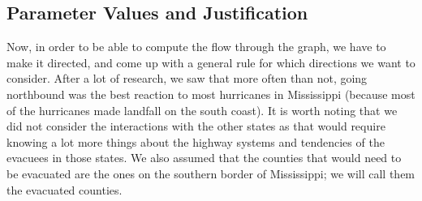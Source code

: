 \documentclass[titlepage]{article}
\begin{document}
  \subsection{Parameter Values and Justification}
    \par Now, in order to be able to compute the flow through the graph, we have to make it directed, and come up with a general rule for which directions we want to consider. After a lot of research, we saw that more often than not, going northbound was the best reaction to most hurricanes in Mississippi (because most of the hurricanes made landfall on the south coast). It is worth noting that we did not consider the interactions with the other states as that would require knowing a lot more things about the highway systems and tendencies of the evacuees in those states. We also assumed that the counties that would need to be evacuated are the ones on the southern border of Mississippi; we will call them the evacuated counties.
\end{document}
